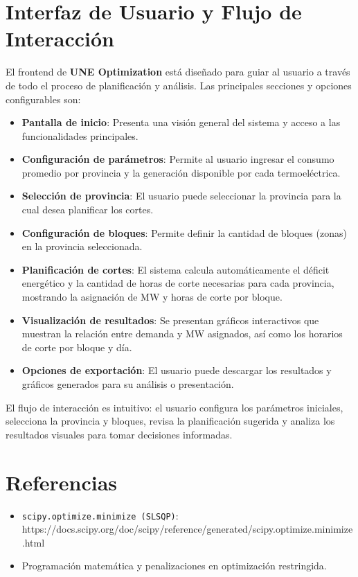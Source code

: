 \documentclass[a4paper,12pt]{article}
\begin{document}
\section{Interfaz de Usuario y Flujo de Interacción}
El frontend de \textbf{UNE Optimization} está diseñado para guiar al usuario a través de todo el proceso de planificación y análisis. Las principales secciones y opciones configurables son:
\begin{itemize}
    \item \textbf{Pantalla de inicio}: Presenta una visión general del sistema y acceso a las funcionalidades principales.
    \item \textbf{Configuración de parámetros}: Permite al usuario ingresar el consumo promedio por provincia y la generación disponible por cada termoeléctrica.
    \item \textbf{Selección de provincia}: El usuario puede seleccionar la provincia para la cual desea planificar los cortes.
    \item \textbf{Configuración de bloques}: Permite definir la cantidad de bloques (zonas) en la provincia seleccionada.
    \item \textbf{Planificación de cortes}: El sistema calcula automáticamente el déficit energético y la cantidad de horas de corte necesarias para cada provincia, mostrando la asignación de MW y horas de corte por bloque.
    \item \textbf{Visualización de resultados}: Se presentan gráficos interactivos que muestran la relación entre demanda y MW asignados, así como los horarios de corte por bloque y día.
    \item \textbf{Opciones de exportación}: El usuario puede descargar los resultados y gráficos generados para su análisis o presentación.
\end{itemize}
El flujo de interacción es intuitivo: el usuario configura los parámetros iniciales, selecciona la provincia y bloques, revisa la planificación sugerida y analiza los resultados visuales para tomar decisiones informadas.

\section{Referencias}
\begin{itemize}
    \item \texttt{scipy.optimize.minimize (SLSQP)}: https://docs.scipy.org/doc/scipy/reference/generated/scipy.optimize.minimize.html
    \item Programación matemática y penalizaciones en optimización restringida.
\end{itemize}
\end{document}
